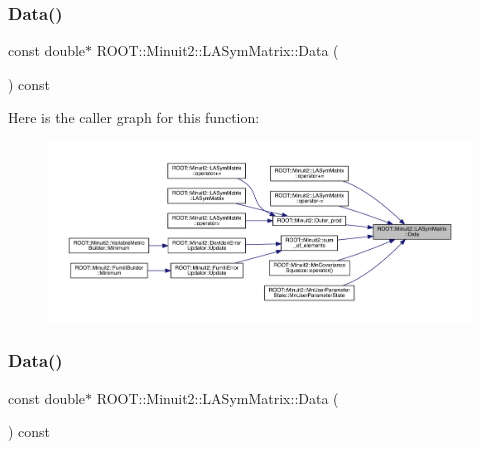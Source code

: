 \subsubsection{\texorpdfstring{Data()}{Data()}\hspace{0.1cm}{\footnotesize\ttfamily [1/4]}}
{\footnotesize\ttfamily const double$\ast$ R\+O\+O\+T\+::\+Minuit2\+::\+L\+A\+Sym\+Matrix\+::\+Data (\begin{DoxyParamCaption}{ }\end{DoxyParamCaption}) const\hspace{0.3cm}{\ttfamily [inline]}}

Here is the caller graph for this function\+:\nopagebreak
\begin{figure}[H]
\begin{center}
\leavevmode
\includegraphics[width=350pt]{d3/d72/classROOT_1_1Minuit2_1_1LASymMatrix_ab1fb932a4ad517108a3b58473b6d8803_icgraph}
\end{center}
\end{figure}
\mbox{\label{classROOT_1_1Minuit2_1_1LASymMatrix_ab1fb932a4ad517108a3b58473b6d8803}} 
\subsubsection{\texorpdfstring{Data()}{Data()}\hspace{0.1cm}{\footnotesize\ttfamily [2/4]}}
{\footnotesize\ttfamily const double$\ast$ R\+O\+O\+T\+::\+Minuit2\+::\+L\+A\+Sym\+Matrix\+::\+Data (\begin{DoxyParamCaption}{ }\end{DoxyParamCaption}) const\hspace{0.3cm}{\ttfamily [inline]}}

\mbox{\label{classROOT_1_1Minuit2_1_1LASymMatrix_abb2b699b82e6aa2803d01e16683433eb}} 
